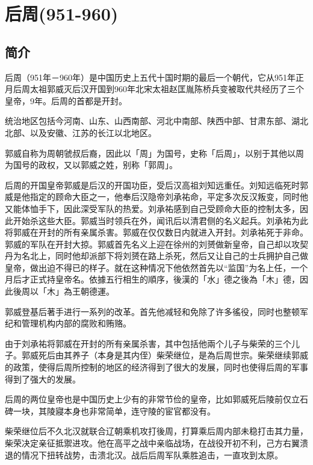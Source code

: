 

\section{后周\tiny(951-960)}

\subsection{简介}

后周（951年－960年）是中国历史上五代十国时期的最后一个朝代，它从951年正月后周太祖郭威灭后汉开国到960年北宋太祖赵匡胤陈桥兵变被取代共经历了三个皇帝，9年。后周的首都是开封。

统治地区包括今河南、山东、山西南部、河北中南部、陕西中部、甘肃东部、湖北北部、以及安徽、江苏的长江以北地区。

郭威自称为周朝虢叔后裔，因此以「周」为国号，史称「后周」，以别于其他以周为国号的政权，又以郭威之姓，别称「郭周」。

后周的开国皇帝郭威是后汉的开国功臣，受后汉高祖刘知远重任。刘知远临死时郭威是他指定的顾命大臣之一，他奉后汉隐帝刘承祐命，平定多次反汉叛变，同时他又能体恤手下，因此深受军队的热爱。刘承祐感到自己受顾命大臣的控制太多，因此开始杀这些大臣。郭威当时领兵在外，闻讯后以清君侧的名义起兵。刘承祐为此将郭威在开封的所有亲属杀害。郭威在仅仅数日内就进入开封。刘承祐死于非命。郭威的军队在开封大掠。郭威首先名义上迎在徐州的刘赟做新皇帝，自己却以攻契丹为名北上，同时他却派部下将刘赟在路上杀死，然后又让自己的士兵拥护自己做皇帝，做出迫不得已的样子。就在这种情况下他依然首先以“监国”为名上任，一个月后才正式持皇帝名。依據五行相生的順序，後漢的「水」德之後為「木」德，因此後周以「木」為王朝德運。

郭威登基后著手进行一系列的改革。首先他减轻和免除了许多徭役，同时也整顿军纪和管理机构内部的腐败和贿赂。

由于刘承祐将郭威在开封的所有亲属杀害，其中包括他兩个儿子与柴荣的三个儿子。郭威死后由其养子（本身是其内侄）柴荣继位，是為后周世宗。柴荣继续郭威的政策，使得后周所控制的地区的经济得到了很大的发展，同时也使得后周的军事得到了强大的发展。

后周的两位皇帝也是中国历史上少有的非常节俭的皇帝，比如郭威死后陵前仅立石碑一块，其陵寢本身也非常简单，连守陵的宦官都没有。

柴荣继位后不久北汉就联合辽朝乘机攻打後周，打算乘后周内部未稳打击其力量，柴荣决定亲征抵禦进攻。他在高平之战中亲临战场，在战役开初不利，己方右翼溃退的情况下扭转战势，击溃北汉。战后后周军队乘胜追击，一直攻到太原。

